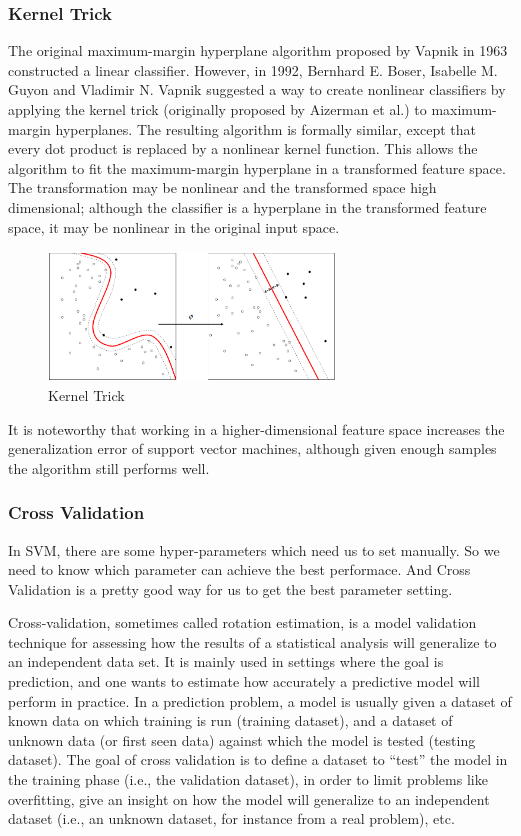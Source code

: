 \documentclass[conference]{IEEEtran}
\begin{document}
\subsubsection{Kernel Trick}
The original maximum-margin hyperplane algorithm proposed by Vapnik in 1963 constructed a linear classifier. However, in 1992, Bernhard E. Boser, Isabelle M. Guyon and Vladimir N. Vapnik suggested a way to create nonlinear classifiers by applying the kernel trick (originally proposed by Aizerman et al.\cite{Aizerman67theoretical}) to maximum-margin hyperplanes.\cite{Boser92atraining} The resulting algorithm is formally similar, except that every dot product is replaced by a nonlinear kernel function. This allows the algorithm to fit the maximum-margin hyperplane in a transformed feature space. The transformation may be nonlinear and the transformed space high dimensional; although the classifier is a hyperplane in the transformed feature space, it may be nonlinear in the original input space.

\begin{figure}[H]
\centering
\includegraphics[width=3in]{svm2.png}
\caption{Kernel Trick}
\end{figure}

It is noteworthy that working in a higher-dimensional feature space increases the generalization error of support vector machines, although given enough samples the algorithm still performs well.\cite{NIPS2012-4500}
\subsubsection{Cross Validation}
In SVM, there are some hyper-parameters which need us to set manually. So we need to know which parameter can achieve the best performace. And Cross Validation is a pretty good way for us to get the best parameter setting.

Cross-validation, sometimes called rotation estimation, is a model validation technique for assessing how the results of a statistical analysis will generalize to an independent data set. It is mainly used in settings where the goal is prediction, and one wants to estimate how accurately a predictive model will perform in practice. In a prediction problem, a model is usually given a dataset of known data on which training is run (training dataset), and a dataset of unknown data (or first seen data) against which the model is tested (testing dataset). The goal of cross validation is to define a dataset to ``test'' the model in the training phase (i.e., the validation dataset), in order to limit problems like overfitting, give an insight on how the model will generalize to an independent dataset (i.e., an unknown dataset, for instance from a real problem), etc.
\end{document}
